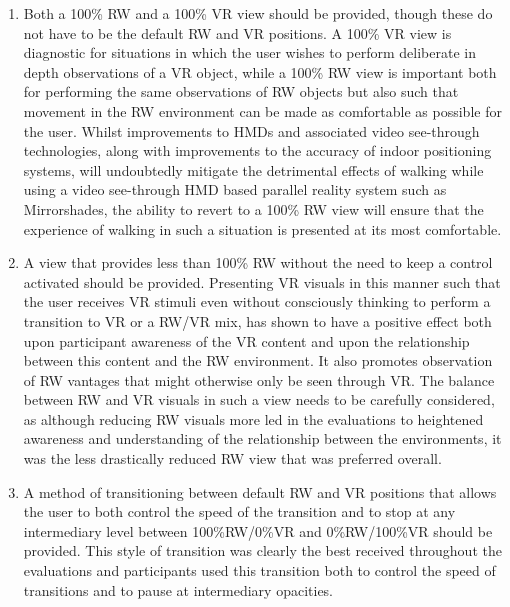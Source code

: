 \begin{enumerate}
	\item Both a 100\% RW and a 100\% VR view should be provided, though these do not have to be the default RW and VR positions. A 100\% VR view is diagnostic for situations in which the user wishes to perform deliberate in depth observations of a VR object, while a 100\% RW view is important both for performing the same observations of RW objects but also such that movement in the RW environment can be made as comfortable as possible for the user. Whilst improvements to HMDs and associated video see-through technologies, along with improvements to the accuracy of indoor positioning systems, will undoubtedly mitigate the detrimental effects of walking while using a video see-through HMD based parallel reality system such as Mirrorshades, the ability to revert to a 100\% RW view will ensure that the experience of walking in such a situation is presented at its most comfortable.
	\item A view that provides less than 100\% RW without the need to keep a control activated should be provided. Presenting VR visuals in this manner such that the user receives VR stimuli even without consciously thinking to perform a transition to VR or a RW/VR mix, has shown to have a positive effect both upon participant awareness of the VR content and upon the relationship between this content and the RW environment. It also promotes observation of RW vantages that might otherwise only be seen through VR. The balance between RW and VR visuals in such a view needs to be carefully considered, as although reducing RW visuals more led in the evaluations to heightened awareness and understanding of the relationship between the environments, it was the less drastically reduced RW view that was preferred overall.
	\item A method of transitioning between default RW and VR positions that allows the user to both control the speed of the transition and to stop at any intermediary level between 100\%RW/0\%VR and 0\%RW/100\%VR should be provided. This style of transition was clearly the best received throughout the evaluations and participants used this transition both to control the speed of transitions and to pause at intermediary opacities.
\end{enumerate}

